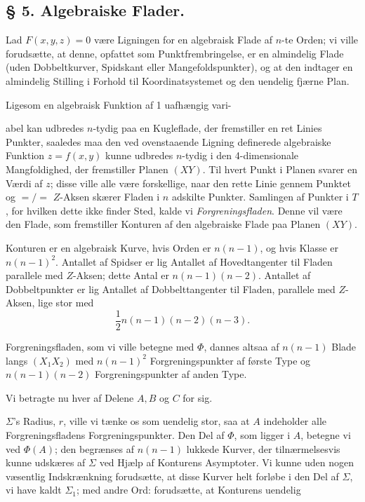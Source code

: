 \documentclass{article}
\begin{document}
\subsection*{§ 5. Algebraiske Flader.}

Lad $F(x, y, z) = 0$ være Ligningen for en algebraisk Flade af $n$-te Orden; vi ville forudsætte, at denne, opfattet som Punktfrembringelse, er en almindelig Flade (uden Dobbeltkurver, Spidskant eller Mangefoldspunkter), og at den indtager en almindelig Stilling i Forhold til Koordinatsystemet og den uendelig fjærne Plan.

Ligesom en algebraisk Funktion af 1 uafhængig vari-

abel kan udbredes $n$-tydig paa en Kugleflade, der fremstiller en ret Linies Punkter, saaledes maa den ved ovenstaaende Ligning definerede algebraiske Funktion $z = f(x, y)$ kunne udbredes $n$-tydig i den 4-dimensionale Mangfoldighed, der fremstiller Planen $(XY)$. Til hvert Punkt i Planen svarer en Værdi af $z$; disse ville alle være forskellige, naar den rette Linie gennem Punktet og $=/\!=$ $Z$-Aksen skærer Fladen i $n$ adskilte Punkter. Samlingen af Punkter i $T$, for hvilken dette ikke finder Sted, kalde vi \emph{Forgreningsfladen}. Denne vil være den Flade, som fremstiller Konturen af den algebraiske Flade paa Planen $(XY)$.

Konturen er en algebraisk Kurve, hvis Orden er $n(n - 1)$, og hvis Klasse er $n(n - 1)^2$. Antallet af Spidser er lig Antallet af Hovedtangenter til Fladen parallele med $Z$-Aksen; dette Antal er $n(n - 1)(n - 2)$. Antallet af Dobbeltpunkter er lig Antallet af Dobbelttangenter til Fladen, parallele med $Z$-Aksen, lige stor med
\[
\frac{1}{2} n(n - 1)(n - 2)(n - 3).
\]

Forgreningsfladen, som vi ville betegne med $\Phi$, dannes altsaa af $n(n - 1)$ Blade langs $(X_1 X_2)$ med $n(n - 1)^2$ Forgreningspunkter af første Type og $n(n - 1)(n - 2)$ Forgreningspunkter af anden Type.

Vi betragte nu hver af Delene $A, B$ og $C$ for sig.

$\Sigma$'s Radius, $r$, ville vi tænke os som uendelig stor, saa at $A$ indeholder alle Forgreningsfladens Forgreningspunkter. Den Del af $\Phi$, som ligger i $A$, betegne vi ved $\Phi(A)$; den begrænses af $n(n - 1)$ lukkede Kurver, der tilnærmelsesvis kunne udskæres af $\Sigma$ ved Hjælp af Konturens Asymptoter. Vi kunne uden nogen væsentlig Indskrænkning forudsætte, at disse Kurver helt forløbe i den Del af $\Sigma$, vi have kaldt $\Sigma_1$; med andre Ord: forudsætte, at Konturens uendelig
\end{document}
